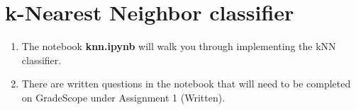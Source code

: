 \section{k-Nearest Neighbor classifier}

\begin{enumerate}
    \item {} The notebook \textbf{knn.ipynb} will walk you through implementing the kNN classifier.
    \item {} There are written questions in the notebook that will need to be completed on GradeScope under Assignment 1 (Written). 
\end{enumerate}
